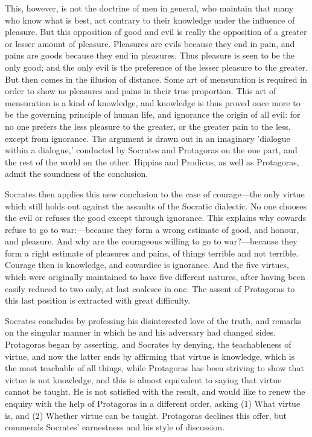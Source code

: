 \documentclass[11pt,letter]{article}
\begin{document}
\par  This, however, is not the doctrine of men in general, who maintain that many who know what is best, act contrary to their knowledge under the influence of pleasure. But this opposition of good and evil is really the opposition of a greater or lesser amount of pleasure. Pleasures are evils because they end in pain, and pains are goods because they end in pleasures. Thus pleasure is seen to be the only good; and the only evil is the preference of the lesser pleasure to the greater. But then comes in the illusion of distance. Some art of mensuration is required in order to show us pleasures and pains in their true proportion. This art of mensuration is a kind of knowledge, and knowledge is thus proved once more to be the governing principle of human life, and ignorance the origin of all evil: for no one prefers the less pleasure to the greater, or the greater pain to the less, except from ignorance. The argument is drawn out in an imaginary 'dialogue within a dialogue,' conducted by Socrates and Protagoras on the one part, and the rest of the world on the other. Hippias and Prodicus, as well as Protagoras, admit the soundness of the conclusion.

\par  Socrates then applies this new conclusion to the case of courage—the only virtue which still holds out against the assaults of the Socratic dialectic. No one chooses the evil or refuses the good except through ignorance. This explains why cowards refuse to go to war:—because they form a wrong estimate of good, and honour, and pleasure. And why are the courageous willing to go to war?—because they form a right estimate of pleasures and pains, of things terrible and not terrible. Courage then is knowledge, and cowardice is ignorance. And the five virtues, which were originally maintained to have five different natures, after having been easily reduced to two only, at last coalesce in one. The assent of Protagoras to this last position is extracted with great difficulty.

\par  Socrates concludes by professing his disinterested love of the truth, and remarks on the singular manner in which he and his adversary had changed sides. Protagoras began by asserting, and Socrates by denying, the teachableness of virtue, and now the latter ends by affirming that virtue is knowledge, which is the most teachable of all things, while Protagoras has been striving to show that virtue is not knowledge, and this is almost equivalent to saying that virtue cannot be taught. He is not satisfied with the result, and would like to renew the enquiry with the help of Protagoras in a different order, asking (1) What virtue is, and (2) Whether virtue can be taught. Protagoras declines this offer, but commends Socrates' earnestness and his style of discussion.
\end{document}
